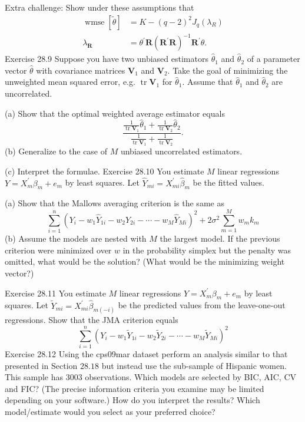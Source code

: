 \documentclass[10pt]{article}
\begin{document}
Extra challenge: Show under these assumptions that
$$
\begin{aligned}
\operatorname{wmse}[\tilde{\theta}] &=K-(q-2)^{2} J_{q}\left(\lambda_{R}\right) \\
\lambda_{\boldsymbol{R}} &=\theta^{\prime} \boldsymbol{R}\left(\boldsymbol{R}^{\prime} \boldsymbol{R}\right)^{-1} \boldsymbol{R}^{\prime} \theta .
\end{aligned}
$$
Exercise 28.9 Suppose you have two unbiased estimators $\widehat{\theta}_{1}$ and $\widehat{\theta}_{2}$ of a parameter vector $\widehat{\theta}$ with covariance matrices $\boldsymbol{V}_{1}$ and $\boldsymbol{V}_{2}$. Take the goal of minimizing the unweighted mean squared error, e.g. $\operatorname{tr} \boldsymbol{V}_{1}$ for $\widehat{\theta}_{1}$. Assume that $\widehat{\theta}_{1}$ and $\widehat{\theta}_{2}$ are uncorrelated.

(a) Show that the optimal weighted average estimator equals
$$
\frac{\frac{1}{\operatorname{tr} \boldsymbol{V}_{1}} \widehat{\theta}_{1}+\frac{1}{\operatorname{tr} \boldsymbol{V}_{2}} \widehat{\theta}_{2}}{\frac{1}{\operatorname{tr} \boldsymbol{V}_{1}}+\frac{1}{\operatorname{tr} \boldsymbol{V}_{2}}} .
$$
(b) Generalize to the case of $M$ unbiased uncorrelated estimators.

(c) Interpret the formulae. Exercise 28.10 You estimate $M$ linear regressions $Y=X_{m}^{\prime} \beta_{m}+e_{m}$ by least squares. Let $\widehat{Y}_{m i}=X_{m i}^{\prime} \widehat{\beta}_{m}$ be the fitted values.

(a) Show that the Mallows averaging criterion is the same as
$$
\sum_{i=1}^{n}\left(Y_{i}-w_{1} \widehat{Y}_{1 i}-w_{2} \widehat{Y}_{2 i}-\cdots-w_{M} \widehat{Y}_{M i}\right)^{2}+2 \sigma^{2} \sum_{m=1}^{M} w_{m} k_{m}
$$
(b) Assume the models are nested with $M$ the largest model. If the previous criterion were minimized over $w$ in the probability simplex but the penalty was omitted, what would be the solution? (What would be the minimizing weight vector?)

Exercise 28.11 You estimate $M$ linear regressions $Y=X_{m}^{\prime} \beta_{m}+e_{m}$ by least squares. Let $\widetilde{Y}_{m i}=X_{m i}^{\prime} \widehat{\beta}_{m(-i)}$ be the predicted values from the leave-one-out regressions. Show that the JMA criterion equals
$$
\sum_{i=1}^{n}\left(Y_{i}-w_{1} \widetilde{Y}_{1 i}-w_{2} \widetilde{Y}_{2 i}-\cdots-w_{M} \widetilde{Y}_{M i}\right)^{2}
$$
Exercise 28.12 Using the cps09mar dataset perform an analysis similar to that presented in Section $28.18$ but instead use the sub-sample of Hispanic women. This sample has 3003 observations. Which models are selected by BIC, AIC, CV and FIC? (The precise information criteria you examine may be limited depending on your software.) How do you interpret the results? Which model/estimate would you select as your preferred choice?
\end{document}
